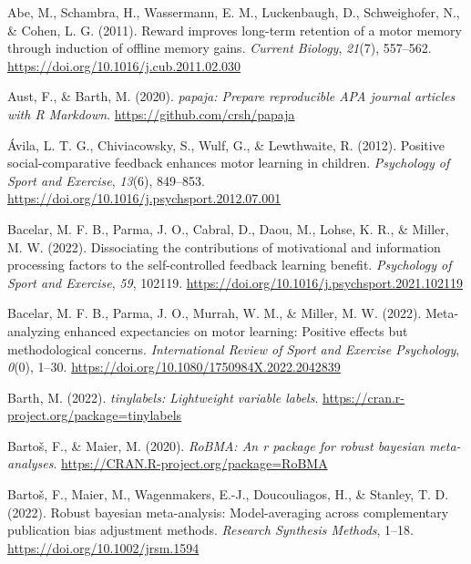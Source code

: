 \documentclass[
  doc, donotrepeattitle,floatsintext]{apa7}
\newlength{\cslhangindent}
\newlength{\cslentryspacingunit} %
\newenvironment{CSLReferences}[2] %
 {%
  \setlength{\parindent}{0pt}
  \ifodd #1
  \let\oldpar\par
  \def\par{\hangindent=\cslhangindent\oldpar}
  \fi
  \setlength{\parskip}{#2\cslentryspacingunit}
 }%
 {}
\begin{document}
\hypertarget{refs}{}
\begin{CSLReferences}{1}{0}
\leavevmode{}%
Abe, M., Schambra, H., Wassermann, E. M., Luckenbaugh, D., Schweighofer, N., \& Cohen, L. G. (2011). Reward improves long-term retention of a motor memory through induction of offline memory gains. \emph{Current Biology}, \emph{21}(7), 557--562. \url{https://doi.org/10.1016/j.cub.2011.02.030}

\leavevmode{}%
Aust, F., \& Barth, M. (2020). \emph{{papaja}: {Prepare} reproducible {APA} journal articles with {R Markdown}}. \url{https://github.com/crsh/papaja}

\leavevmode{}%
Ávila, L. T. G., Chiviacowsky, S., Wulf, G., \& Lewthwaite, R. (2012). Positive social-comparative feedback enhances motor learning in children. \emph{Psychology of Sport and Exercise}, \emph{13}(6), 849--853. \url{https://doi.org/10.1016/j.psychsport.2012.07.001}

\leavevmode{}%
Bacelar, M. F. B., Parma, J. O., Cabral, D., Daou, M., Lohse, K. R., \& Miller, M. W. (2022). Dissociating the contributions of motivational and information processing factors to the self-controlled feedback learning benefit. \emph{Psychology of Sport and Exercise}, \emph{59}, 102119. \url{https://doi.org/10.1016/j.psychsport.2021.102119}

\leavevmode{}%
Bacelar, M. F. B., Parma, J. O., Murrah, W. M., \& Miller, M. W. (2022). Meta-analyzing enhanced expectancies on motor learning: Positive effects but methodological concerns. \emph{International Review of Sport and Exercise Psychology}, \emph{0}(0), 1--30. \url{https://doi.org/10.1080/1750984X.2022.2042839}

\leavevmode{}%
Barth, M. (2022). \emph{{tinylabels}: Lightweight variable labels}. \url{https://cran.r-project.org/package=tinylabels}

\leavevmode{}%
Bartoš, F., \& Maier, M. (2020). \emph{RoBMA: An r package for robust bayesian meta-analyses}. \url{https://CRAN.R-project.org/package=RoBMA}

\leavevmode{}%
Bartoš, F., Maier, M., Wagenmakers, E.-J., Doucouliagos, H., \& Stanley, T. D. (2022). Robust bayesian meta-analysis: Model-averaging across complementary publication bias adjustment methods. \emph{Research Synthesis Methods}, 1--18. \url{https://doi.org/10.1002/jrsm.1594}


\end{CSLReferences}
\end{document}
